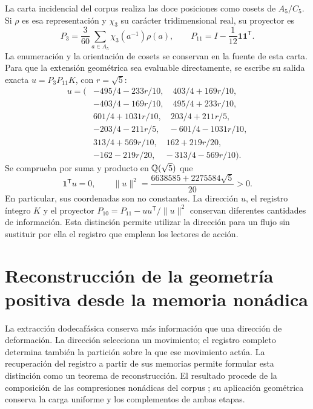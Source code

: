 \documentclass[a4paper,10pt]{article}
\theoremstyle{definition}\newtheorem{definition}[theorem]{Definición}
\theoremstyle{remark}\newtheorem{remark}[theorem]{Observación}
\numberwithin{equation}{section}
\begin{document}
La carta incidencial del corpus realiza las doce posiciones como cosets
de \(A_5/C_5\). Si \(\rho\) es esa representación y \(\chi_3\) su
carácter tridimensional real, su proyector es
\[
 P_3=\frac3{60}\sum_{a\in A_5}\chi_3(a^{-1})\rho(a),\qquad
 P_{11}=I-\frac1{12}\mathbf1\mathbf1^{\mathsf T}.
\]
La enumeración y la orientación de cosets se conservan en la fuente de
esta carta. Para que la extensión geométrica sea evaluable directamente,
se escribe su salida exacta \(u=P_3P_{11}K\), con \(r=\sqrt5\):
\begin{equation}
\begin{split}
u=\bigl(&-495/4-233r/10,\quad403/4+169r/10,\\
&-403/4-169r/10,\quad495/4+233r/10,\\
&601/4+1031r/10,\quad203/4+211r/5,\\
&-203/4-211r/5,\quad-601/4-1031r/10,\\
&313/4+569r/10,\quad162+219r/20,\\
&-162-219r/20,\quad-313/4-569r/10\bigr).
\end{split}
\label{eq:u-main}
\end{equation}
Se comprueba por suma y producto en \(\mathbb Q(\sqrt5)\) que
\[
 \mathbf1^{\mathsf T}u=0,\qquad
 \|u\|^2=\frac{6638585+2275584\sqrt5}{20}>0.
\]
En particular, sus coordenadas son no constantes. La dirección \(u\),
el registro íntegro \(K\) y el proyector
\(P_{10}=P_{11}-uu^{\mathsf T}/\|u\|^2\) conservan diferentes cantidades
de información. Esta distinción permite utilizar la dirección para un
flujo sin sustituir por ella el registro que emplean los lectores de acción.

\section{Reconstrucción de la geometría positiva desde la memoria nonádica}
\label{sec:memory}

La extracción dodecafásica conserva más información que una dirección de
deformación. La dirección selecciona un movimiento; el registro completo
determina también la partición sobre la que ese movimiento actúa. La
recuperación del registro a partir de sus memorias permite formular esta
distinción como un teorema de reconstrucción. El resultado procede de la
composición de las compresiones nonádicas del corpus \cite{hmtX}; su aplicación
geométrica conserva la carga uniforme y los complementos de ambas etapas.
\end{document}
